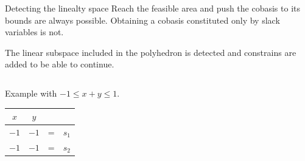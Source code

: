 \begin{frame}{Detecting the linealty space}
Reach the feasible area and push the cobasis to its bounds are always possible. Obtaining a cobasis constituted only by slack variables is not.

The linear subspace included in the polyhedron is detected and constrains are added to be able to continue.

\vspace*{0.2cm}

\begin{columns}[c]
\begin{column}{5cm}
Example with $-1\leq x+y\leq 1$.\\

\begin{tabular}{| c | c || c c |}
	\hline	
	$x$ & $y$ & & \\
	\hline
	\hline	
   	$-1$ & $-1$ & = & $s_1$\\ \hline	
   	$-1$ & $-1$ & = & $s_2$\\ \hline 
\end{tabular}

\vspace*{0.2cm}

\end{column}
\begin{column}{5cm}
\begin{figure}
\end{figure}
\end{column}
\end{columns}



\end{frame}
